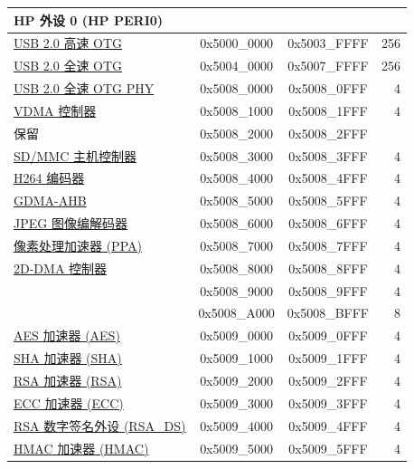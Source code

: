 \begin{ThreePartTable}
\begin{longtable}[c]{ |p{7cm}|c|c|r| }
\multicolumn{4}{|l|}{\textbf{HP 外设 0 (HP PERI0)}} \\ \hline
\hyperref[mod:usbotghs]{USB 2.0 高速 OTG}          & 0x5000\_0000 & 0x5003\_FFFF &   256\\\hline
\hyperref[mod:usbotgfs]{USB 2.0 全速 OTG}          & 0x5004\_0000 & 0x5007\_FFFF &   256\\\hline
\hyperref[mod:usbotgfs]{USB 2.0 全速 OTG PHY}           & 0x5008\_0000 & 0x5008\_0FFF &   4\\\hline
\hyperref[mod:vdma]{VDMA 控制器}           & 0x5008\_1000 & 0x5008\_1FFF &   4\\\hline
\rowcolor{gray!25}  保留                   & 0x5008\_2000 & 0x5008\_2FFF &   \\\hline
\hyperref[mod:sdhost]{SD/MMC 主机控制器}           & 0x5008\_3000 & 0x5008\_3FFF &   4\\\hline
\hyperref[mod:h264enc]{H264 编码器}           & 0x5008\_4000 & 0x5008\_4FFF &   4\\\hline
\hyperref[mod:dma]{GDMA-AHB}           & 0x5008\_5000 & 0x5008\_5FFF &   4\\\hline
\hyperref[mod:jpegcodec]{JPEG 图像编解码器}           & 0x5008\_6000 & 0x5008\_6FFF &   4\\\hline
\hyperref[mod:ppa]{像素处理加速器 (PPA)}           & 0x5008\_7000 & 0x5008\_7FFF &   4\\\hline
\hyperref[mod:2ddma]{2D-DMA 控制器}           & 0x5008\_8000 & 0x5008\_8FFF &   4\\\hline
\tagged{ESP32-P4-latest}{
    \hyperref[mod:keymng]{密钥管理器}           & 0x5008\_9000 & 0x5008\_9FFF &   4\\\hline
}
\hyperref[mod:dma]{GDMA-AXI}           & 0x5008\_A000 & 0x5008\_BFFF &   8\\\hline
\hyperref[mod:aes]{AES 加速器 (AES)}      & 0x5009\_0000 & 0x5009\_0FFF &   4\\\hline
\hyperref[mod:sha]{SHA 加速器 (SHA)}      & 0x5009\_1000 & 0x5009\_1FFF &   4\\\hline
\hyperref[mod:rsa]{RSA 加速器 (RSA)}      & 0x5009\_2000 & 0x5009\_2FFF &   4\\\hline
\hyperref[mod:ecc]{ECC 加速器 (ECC)}  & 0x5009\_3000 & 0x5009\_3FFF &   4\\\hline
\hyperref[mod:digsig]{RSA 数字签名外设 (RSA\_DS)}   & 0x5009\_4000 & 0x5009\_4FFF &   4\\\hline
\hyperref[mod:hmac]{HMAC 加速器 (HMAC)}     & 0x5009\_5000 & 0x5009\_5FFF &   4\\\hline

\end{longtable}
\end{ThreePartTable}
